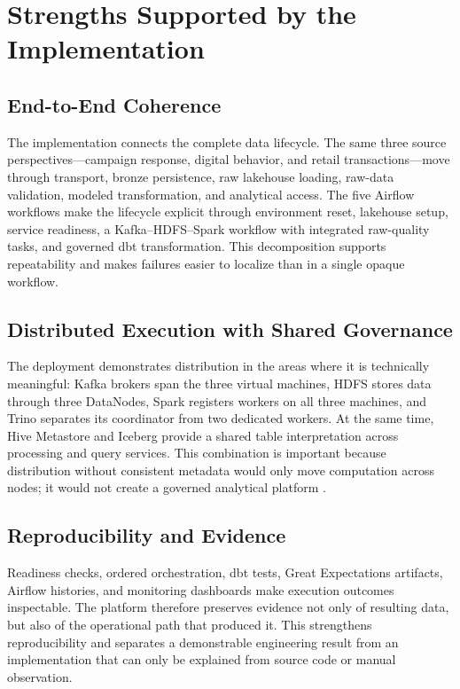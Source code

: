 \section{Strengths Supported by the Implementation}
\subsection{End-to-End Coherence}
The implementation connects the complete data lifecycle. The same three source perspectives---campaign response, digital behavior, and retail transactions---move through transport, bronze persistence, raw lakehouse loading, raw-data validation, modeled transformation, and analytical access. The five Airflow workflows make the lifecycle explicit through environment reset, lakehouse setup, service readiness, a Kafka--HDFS--Spark workflow with integrated raw-quality tasks, and governed dbt transformation. This decomposition supports repeatability and makes failures easier to localize than in a single opaque workflow.

\subsection{Distributed Execution with Shared Governance}
The deployment demonstrates distribution in the areas where it is technically meaningful: Kafka brokers span the three virtual machines, HDFS stores data through three DataNodes, Spark registers workers on all three machines, and Trino separates its coordinator from two dedicated workers. At the same time, Hive Metastore and Iceberg provide a shared table interpretation across processing and query services. This combination is important because distribution without consistent metadata would only move computation across nodes; it would not create a governed analytical platform \cite{apache_hive_docs,apache_iceberg_docs}.

\subsection{Reproducibility and Evidence}
Readiness checks, ordered orchestration, dbt tests, Great Expectations artifacts, Airflow histories, and monitoring dashboards make execution outcomes inspectable. The platform therefore preserves evidence not only of resulting data, but also of the operational path that produced it. This strengthens reproducibility and separates a demonstrable engineering result from an implementation that can only be explained from source code or manual observation.

